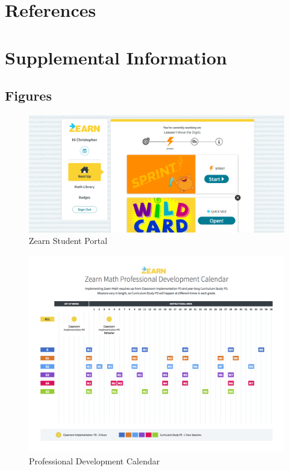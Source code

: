 \documentclass[
  number,
  preprint,
  3p,
  onecolumn]{elsarticle}
\begin{document}
\hypertarget{references}{%
\section{References}\label{references}}

\renewcommand{\bibsection}{}


\hypertarget{supplemental-information}{%
\section{Supplemental Information}\label{supplemental-information}}

\hypertarget{sec-supp-fig}{%
\subsection{Figures}\label{sec-supp-fig}}

\begin{figure}

{\centering \includegraphics{images/student-feed.PNG}

}

\caption{\label{fig-st-portal}Zearn Student Portal}

\end{figure}

\begin{figure}

{\centering \includegraphics{images/PD-calendar.jpg}

}

\caption{\label{fig-prof-dev}Professional Development Calendar}

\end{figure}
\end{document}
